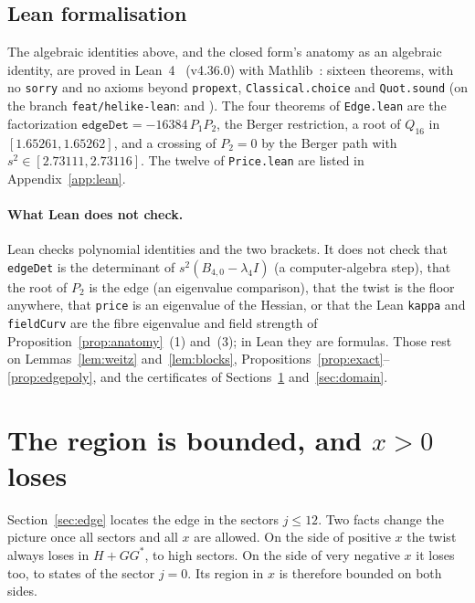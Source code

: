 \documentclass[11pt]{article}
\theoremstyle{definition}
\theoremstyle{remark}
\begin{document}
\subsection{Lean formalisation}\label{subsec:lean}

The algebraic identities above, and the closed form's anatomy as an algebraic identity, are proved in
Lean~4~\cite{lean4} (v4.36.0) with Mathlib~\cite{mathlib2020}: sixteen theorems, with no \texttt{sorry} and no axioms
beyond \texttt{propext}, \texttt{Classical.choice} and \texttt{Quot.sound} (on the branch \texttt{feat/helike-lean}: 
and ). The four theorems of \texttt{Edge.lean} are the factorization $\mathtt{edgeDet}=-16384\,P_1P_2$,
the Berger restriction, a root of $Q_{16}$ in $[1.65261,1.65262]$, and a crossing of $P_2=0$ by the Berger path with
$s^2\in[2.73111,2.73116]$. The twelve of \texttt{Price.lean} are listed in Appendix~\ref{app:lean}.

\paragraph{What Lean does not check.} Lean checks polynomial identities and the two brackets. It does not check that
\texttt{edgeDet} is the determinant of $s^2(B_{4,0}-\lambda_4I)$ (a computer-algebra step), that the root of $P_2$ is the
edge (an eigenvalue comparison), that the twist is the floor anywhere, that \texttt{price} is an eigenvalue of the
Hessian, or that the Lean \texttt{kappa} and \texttt{fieldCurv} are the fibre eigenvalue and field strength of
Proposition~\ref{prop:anatomy}~(1) and~(3); in Lean they are formulas. Those rest on Lemmas~\ref{lem:weitz}
and~\ref{lem:blocks}, Propositions~\ref{prop:exact}--\ref{prop:edgepoly}, and the certificates of
Sections~\ref{sec:interval} and~\ref{sec:domain}.

\section{The region is bounded, and \texorpdfstring{$x>0$}{x>0} loses}\label{sec:interval}

Section~\ref{sec:edge} locates the edge in the sectors $j\le12$. Two facts change the picture once all sectors and
all $x$ are allowed. On the side of positive $x$ the twist always loses in $H+GG^*$, to high sectors. On the side of
very negative $x$ it loses too, to states of the sector $j=0$. Its region in $x$ is therefore bounded on both sides.
\end{document}
